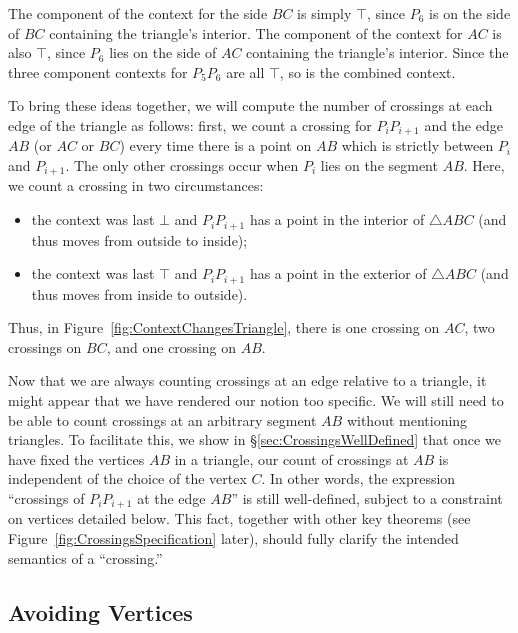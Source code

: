 The component of the context for the side $BC$ is simply $\top$, since $P_6$ is on the side of $BC$ containing the triangle's interior. The component of the context for $AC$ is also $\top$, since $P_6$ lies on the side of $AC$ containing the triangle's interior. Since the three component contexts for $P_5P_6$ are all $\top$, so is the combined context.

To bring these ideas together, we will compute the number of crossings at each edge of the triangle as follows: first, we count a crossing for $P_iP_{i+1}$ and the edge $AB$ (or $AC$ or $BC$) every time there is a point on $AB$ which is strictly between $P_i$ and $P_{i+1}$. The only other crossings occur when $P_i$ lies on the segment $AB$. Here, we count a crossing in two circumstances:
\begin{itemize}
\item the context was last $\bot$ and $P_iP_{i+1}$ has a point in the interior of $\triangle ABC$ (and thus moves from outside to inside);
\item the context was last $\top$ and $P_iP_{i+1}$ has a point in the exterior of $\triangle ABC$ (and thus moves from inside to outside).
\end{itemize}

Thus, in Figure~\ref{fig:ContextChangesTriangle}, there is one crossing on $AC$, two crossings on $BC$, and one crossing on $AB.$

Now that we are always counting crossings at an edge relative to a triangle, it might appear that we have rendered our notion too specific. We will still need to be able to count crossings at an arbitrary segment $AB$ without mentioning triangles. To facilitate this, we show in \S\ref{sec:CrossingsWellDefined} that once we have fixed the vertices $AB$ in a triangle, our count of crossings at $AB$ is independent of the choice of the vertex $C$. In other words, the expression ``crossings of $P_iP_{i+1}$ at the edge $AB$'' is still well-defined, subject to a constraint on vertices detailed below. This fact, together with other key theorems (see Figure~\ref{fig:CrossingsSpecification} later), should fully clarify the intended semantics of a ``crossing.''

\subsection{Avoiding Vertices}\label{sec:EdgeCases}

